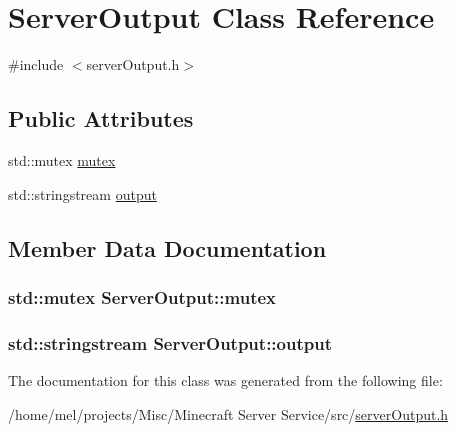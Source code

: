 \hypertarget{class_server_output}{}\section{Server\+Output Class Reference}
\label{class_server_output}


{\ttfamily \#include $<$server\+Output.\+h$>$}

\subsection*{Public Attributes}
\begin{DoxyCompactItemize}
\item 
std\+::mutex \hyperlink{class_server_output_ac861fbacca3246e4d03defba5ffdd9f3}{mutex}
\item 
std\+::stringstream \hyperlink{class_server_output_a549f942f866ba6c132306a732d9c568f}{output}
\end{DoxyCompactItemize}


\subsection{Member Data Documentation}
\subsubsection[{\texorpdfstring{mutex}{mutex}}]{\setlength{\rightskip}{0pt plus 5cm}std\+::mutex Server\+Output\+::mutex}\hypertarget{class_server_output_ac861fbacca3246e4d03defba5ffdd9f3}{}\label{class_server_output_ac861fbacca3246e4d03defba5ffdd9f3}
\subsubsection[{\texorpdfstring{output}{output}}]{\setlength{\rightskip}{0pt plus 5cm}std\+::stringstream Server\+Output\+::output}\hypertarget{class_server_output_a549f942f866ba6c132306a732d9c568f}{}\label{class_server_output_a549f942f866ba6c132306a732d9c568f}


The documentation for this class was generated from the following file\+:\begin{DoxyCompactItemize}
\item 
/home/mel/projects/\+Misc/\+Minecraft Server Service/src/\hyperlink{server_output_8h}{server\+Output.\+h}\end{DoxyCompactItemize}
